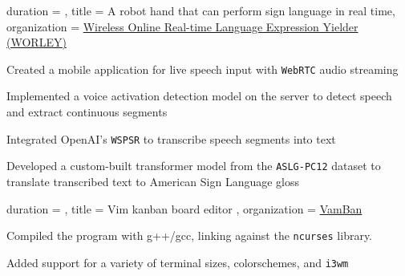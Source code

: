 \documentclass[sidebar-width=2.25in, primary=slate]{clean-resume}
\begin{document}
  \newpage

    \begin{experience}
      {
        duration = {  },
        title = {A robot hand that can perform sign language in real time},
        organization = {\href{https://github.com/Yubo-Cao/worley}{Wireless Online Real-time Language Expression Yielder (WORLEY)\phantom{aaaaaaaaaaaa}}}
      }
      \item Created a mobile application for live speech input with \verb|WebRTC| audio streaming
      \item Implemented a voice activation detection model on the server to detect speech and extract continuous segments
      \item Integrated OpenAI's \verb|WSPSR| to transcribe speech segments into text
      \item Developed a custom-built transformer model from the \verb|ASLG-PC12| dataset to translate transcribed text to American Sign Language gloss
    \end{experience}

    \begin{experience}
      {
        duration = {  },
        title = { Vim kanban board editor },
        organization = { \href{https://github.com/anishgoyal1108/VamBan}{VamBan} }
      }
      \item Compiled the program with g++/gcc, linking against the \verb|ncurses| library.
      \item Added support for a variety of terminal sizes, colorschemes, and \verb|i3wm|
    \end{experience}
\end{document}
